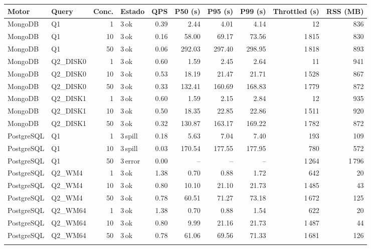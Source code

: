 \begin{tabular}{llrlrrrrrr}
\toprule
Motor & Query & Conc. & Estado & QPS & P50 (s) & P95 (s) & P99 (s) & Throttled (s) & RSS (MB) \\
\midrule
MongoDB & Q1 & 1 & 3\,ok & 0.39 & 2.44 & 4.01 & 4.14 & 12 & 836 \\
MongoDB & Q1 & 10 & 3\,ok & 0.16 & 58.00 & 69.17 & 73.56 & 1\,815 & 830 \\
MongoDB & Q1 & 50 & 3\,ok & 0.06 & 292.03 & 297.40 & 298.95 & 1\,818 & 893 \\
\addlinespace[2pt]
MongoDB & Q2\_DISK0 & 1 & 3\,ok & 0.60 & 1.59 & 2.45 & 2.64 & 11 & 941 \\
MongoDB & Q2\_DISK0 & 10 & 3\,ok & 0.53 & 18.19 & 21.47 & 21.71 & 1\,528 & 867 \\
MongoDB & Q2\_DISK0 & 50 & 3\,ok & 0.33 & 132.41 & 160.69 & 168.83 & 1\,779 & 872 \\
\addlinespace[2pt]
MongoDB & Q2\_DISK1 & 1 & 3\,ok & 0.60 & 1.59 & 2.15 & 2.84 & 12 & 935 \\
MongoDB & Q2\_DISK1 & 10 & 3\,ok & 0.50 & 18.35 & 22.85 & 22.86 & 1\,511 & 920 \\
MongoDB & Q2\_DISK1 & 50 & 3\,ok & 0.32 & 130.87 & 163.17 & 169.22 & 1\,782 & 872 \\
\addlinespace[2pt]
\midrule
PostgreSQL & Q1 & 1 & 3\,spill & 0.18 & 5.63 & 7.04 & 7.40 & 193 & 109 \\
PostgreSQL & Q1 & 10 & 3\,spill & 0.03 & 170.54 & 177.55 & 177.95 & 780 & 572 \\
PostgreSQL & Q1 & 50 & 3\,error & 0.00 & -- & -- & -- & 1\,264 & 1\,796 \\
\addlinespace[2pt]
PostgreSQL & Q2\_WM4 & 1 & 3\,ok & 1.38 & 0.70 & 0.88 & 1.72 & 642 & 20 \\
PostgreSQL & Q2\_WM4 & 10 & 3\,ok & 0.80 & 10.10 & 21.10 & 21.73 & 1\,485 & 43 \\
PostgreSQL & Q2\_WM4 & 50 & 3\,ok & 0.78 & 60.51 & 71.27 & 73.18 & 1\,672 & 125 \\
\addlinespace[2pt]
PostgreSQL & Q2\_WM64 & 1 & 3\,ok & 1.38 & 0.70 & 0.88 & 1.54 & 622 & 20 \\
PostgreSQL & Q2\_WM64 & 10 & 3\,ok & 0.80 & 9.99 & 21.16 & 21.73 & 1\,487 & 44 \\
PostgreSQL & Q2\_WM64 & 50 & 3\,ok & 0.78 & 61.06 & 69.56 & 71.33 & 1\,681 & 126 \\
\addlinespace[2pt]
\bottomrule
\end{tabular}
